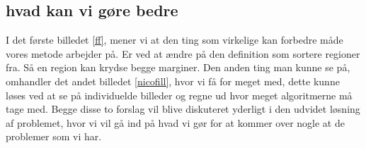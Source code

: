 \clearpage
\subsection{hvad kan vi gøre bedre}
I det første billedet \ref{ff}, mener vi at den ting som virkelige kan
forbedre måde vores metode arbejder på. Er ved at ændre på den
definition som sortere regioner fra. Så en region kan krydse begge
marginer. Den anden ting man kunne se på, omhandler det andet billedet
\ref{nicofill}, hvor vi få for meget med, dette kunne løses ved at se på
individuelde billeder og regne ud hvor meget algoritmerne må tage med.
Begge disse to forslag vil blive diskuteret yderligt i den udvidet
løsning af problemet, hvor vi vil gå ind på hvad vi gør for at kommer
over nogle at de problemer som vi har.

